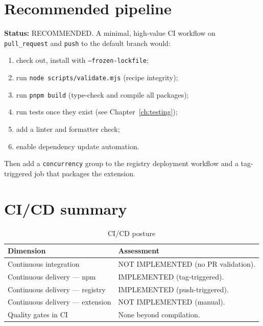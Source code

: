 \section{Recommended pipeline}

\textbf{Status:} RECOMMENDED. A minimal, high-value CI workflow on
\texttt{pull\_request} and \texttt{push} to the default branch would:

\begin{enumerate}
  \item check out, install with \texttt{--frozen-lockfile};
  \item run \texttt{node scripts/validate.mjs} (recipe integrity);
  \item run \texttt{pnpm build} (type-check and compile all packages);
  \item run tests once they exist (see Chapter~\ref{ch:testing});
  \item add a linter and formatter check;
  \item enable dependency update automation.
\end{enumerate}

Then add a \texttt{concurrency} group to the registry deployment workflow and a
tag-triggered job that packages the extension.

\section{CI/CD summary}

\begin{table}[H]
\centering
\caption{CI/CD posture}
\begin{tabular}{p{4cm}p{10.2cm}}
\toprule
\textbf{Dimension} & \textbf{Assessment} \\
\midrule
Continuous integration & NOT IMPLEMENTED (no PR validation). \\
Continuous delivery --- npm & IMPLEMENTED (tag-triggered). \\
Continuous delivery --- registry & IMPLEMENTED (push-triggered). \\
Continuous delivery --- extension & NOT IMPLEMENTED (manual). \\
Quality gates in CI & None beyond compilation. \\
\bottomrule
\end{tabular}
\end{table}
